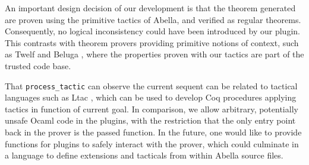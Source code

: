 \documentclass[nocopyrightspace,authoryear]{sigplanconf}
\begin{document}
An important design decision of our development is that the theorem generated are proven using the primitive tactics of Abella, and verified as regular theorems. Consequently, no logical inconsistency could have been introduced by our plugin. This contrasts with theorem provers providing primitive notions of context, such as Twelf \cite{twelfsys} and Beluga \cite{belugasys}, where the properties proven with our tactics are part of the trusted code base.

 That \lstinline|process_tactic| can observe the current sequent can be related to tactical languages such as Ltac \cite{ltacpap}, which can be used to develop Coq procedures applying tactics in function of current goal. In comparison, we allow arbitrary, potentially unsafe Ocaml code in the plugins, with the restriction that the only entry point back in the prover is the passed function. In the future, one would like to provide functions for plugins to safely interact with the prover, which could culminate in a language to define extensions and tacticals from within Abella source files. 







\end{document}
